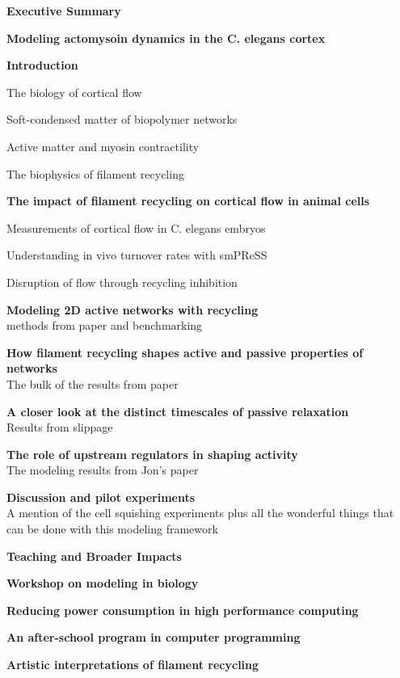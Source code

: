 \documentclass{report}
\begin{document}
\begin{outline}
  \item {\bf Executive Summary }
  \item {\bf Modeling actomysoin dynamics in the C. elegans cortex }
  \begin{outline}
    \item {\bf Introduction }
    \begin{outline}
      \item The biology of cortical flow 
      \item Soft-condensed matter of biopolymer networks
      \item Active matter and myosin contractility 
      \item The biophysics of filament recycling
    \end{outline}
    \item {\bf The impact of filament recycling on cortical flow in animal cells} 
    \begin{outline}
      \item Measurements of cortical flow in C. elegans embryos
      \item Understanding in vivo turnover rates with smPReSS
      \item Disruption of flow through recycling inhibition
    \end{outline}
    \item {\bf Modeling 2D active networks with recycling } \\
      methods from paper and benchmarking 
    \item {\bf How filament recycling shapes active and passive properties of networks} \\
      The bulk of the results from paper
     \item {\bf A closer look at the distinct timescales of passive relaxation} \\
      Results from slippage
    \item {\bf The role of upstream regulators in shaping activity} \\
      The modeling results from Jon's paper
    \item {\bf Discussion and pilot experiments} \\
      A mention of the cell squishing experiments plus all the wonderful things that can be done with this modeling framework
  \end{outline}
  \item {\bf Teaching and Broader Impacts}
  \begin{outline}
    \item {\bf Workshop on modeling in biology } \\
    \item {\bf Reducing power consumption in high performance computing } \\
    \item {\bf An after-school program in computer programming } \\
    \item {\bf Artistic interpretations of filament recycling } \\
      

\end{outline}
\end{outline}
\end{document}
